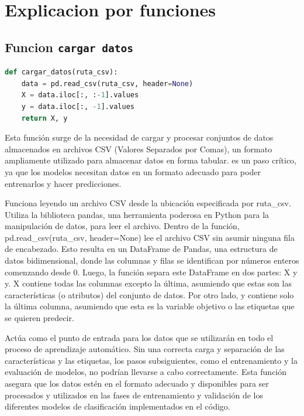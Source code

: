 \documentclass[12pt]{article}
\begin{document}
\vspace{1cm}

\section*{Explicacion por funciones}
\vspace{1cm}
\subsection*{Funcion \texttt{cargar datos}}



\vspace{1cm}

\begin{lstlisting}[language=Python]
def cargar_datos(ruta_csv):
	data = pd.read_csv(ruta_csv, header=None)
	X = data.iloc[:, :-1].values
	y = data.iloc[:, -1].values
	return X, y


\end{lstlisting}
\vspace{1cm}

Esta función surge de la necesidad de cargar y procesar conjuntos de datos almacenados en archivos CSV (Valores Separados por Comas), un formato ampliamente utilizado para almacenar datos en forma tabular. es un paso crítico, ya que los modelos necesitan datos en un formato adecuado para poder entrenarlos y hacer predicciones.\vspace{1cm}

Funciona leyendo un archivo CSV desde la ubicación especificada por ruta\_csv. Utiliza la biblioteca pandas, una herramienta poderosa en Python para la manipulación de datos, para leer el archivo. Dentro de la función, pd.read\_csv(ruta\_csv, header=None) lee el archivo CSV sin asumir ninguna fila de encabezado. Esto resulta en un DataFrame de Pandas, una estructura de datos bidimensional, donde las columnas y filas se identifican por números enteros comenzando desde 0. Luego, la función separa este DataFrame en dos partes: X y y. X contiene todas las columnas excepto la última, asumiendo que estas son las características (o atributos) del conjunto de datos. Por otro lado, y contiene solo la última columna, asumiendo que esta es la variable objetivo o las etiquetas que se quieren predecir.\vspace{1cm}

Actúa como el punto de entrada para los datos que se utilizarán en todo el proceso de aprendizaje automático. Sin una correcta carga y separación de las características y las etiquetas, los pasos subsiguientes, como el entrenamiento y la evaluación de modelos, no podrían llevarse a cabo correctamente. Esta función asegura que los datos estén en el formato adecuado y disponibles para ser procesados y utilizados en las fases de entrenamiento y validación de los diferentes modelos de clasificación implementados en el código.
\end{document}
